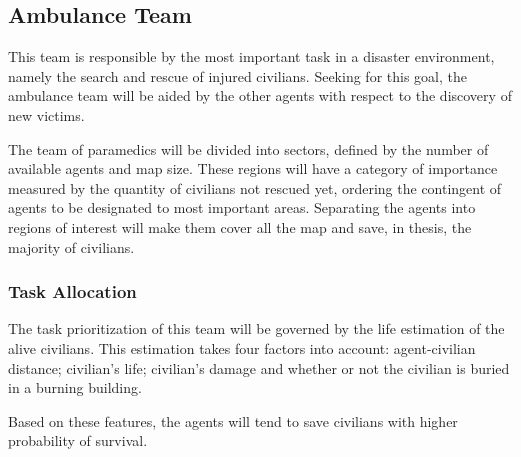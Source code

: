 \subsection{Ambulance Team}
\label{sec:ambulance}

This team is responsible by the most important task in a disaster environment, namely the search and rescue of injured civilians. Seeking for this goal, the ambulance team will be aided by the other agents with respect to the discovery of new victims.

The team of paramedics will be divided into sectors, defined by the number of available agents and map size. These regions will have a category of importance measured by the quantity of civilians not rescued yet, ordering the contingent of agents to be designated to most important areas. Separating the agents into regions of interest will make them cover all the map and save, in thesis, the majority of civilians.

\subsubsection{Task Allocation}

The task prioritization of this team will be governed by the life estimation of the alive civilians. This estimation takes four factors into account: agent-civilian distance; civilian's life; civilian's damage and whether or not the civilian is buried in a burning building.

Based on these features, the agents will tend to save civilians with higher probability of survival. %

